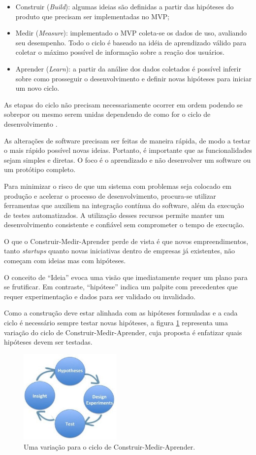 \begin{itemize}
\item Construir (\emph{Build}): algumas ideias são definidas a partir das hipóteses do produto que precisam ser implementadas no MVP;
\item Medir (\emph{Measure}): implementado o MVP coleta-se os dados de uso, avaliando seu desempenho. Todo o ciclo é baseado na idéia de aprendizado válido para coletar o máximo possível de informação sobre a reação dos usuários.
\item Aprender (\emph{Learn}): a partir da análise dos dados coletados é possível inferir sobre como prosseguir o desenvolvimento e definir novas hipóteses para iniciar um novo ciclo.
\end{itemize}
\par As etapas do ciclo não precisam necessariamente ocorrer em ordem podendo se sobrepor ou mesmo serem unidas dependendo de como for o ciclo de desenvolvimento  \citep{ries:11}.
\par As alterações de software precisam ser feitas de maneira rápida, de modo a testar o mais rápido possível novas ideias. Portanto, é importante que as funcionalidades sejam simples e diretas. O foco é o aprendizado e não desenvolver um software ou um protótipo completo.
\par Para minimizar o risco de que um sistema com problemas seja colocado em produção e acelerar o processo de desenvolvimento, procura-se utilizar ferramentas que auxiliem na integração contínua do software, além da execução de testes automatizados. A utilização desses recursos permite manter um desenvolvimento consistente e confiável sem comprometer o tempo de execução.
\par O que o Construir-Medir-Aprender perde de vista é que novos empreendimentos, tanto \emph{startups} quanto novas iniciativas dentro de empresas já existentes, não começam com ideias mas com hipóteses.
\par O conceito de ``Ideia'' evoca uma visão que imediatamente requer um plano para se frutificar. Em contraste, ``hipótese'' indica um palpite com precedentes que requer experimentação e dados para ser validado ou invalidado. \citep{blankendeavor}
\par Como a construção deve estar alinhada com as hipóteses formuladas e a cada ciclo é necessário sempre testar novas hipóteses, a figura \ref{fig:hypotheses-experiment} representa uma variação do ciclo de Construir-Medir-Aprender, cuja proposta é enfatizar quais hipóteses devem ser testadas.
\begin{figure}[htb]
\centering
\includegraphics[width=5cm]{figuras/hypotheses-experiment}
\caption{\label{fig:hypotheses-experiment} Uma variação para o ciclo de Construir-Medir-Aprender.}
\end{figure}

